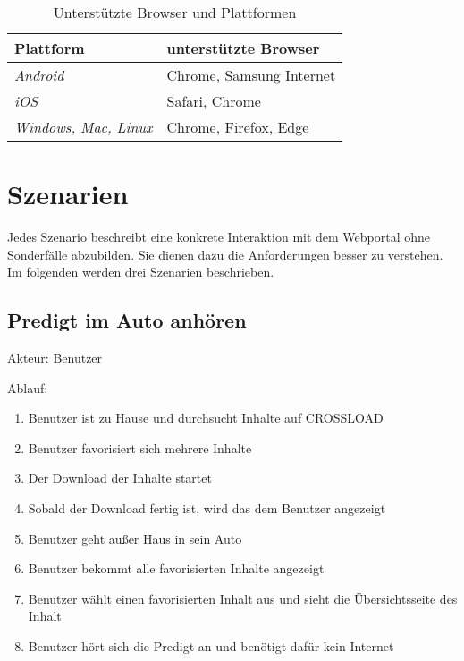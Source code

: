 \begin{table}
  \renewcommand{\arraystretch}{1.2}
  \centering
  \sffamily
  \begin{footnotesize}
    \begin{tabular}{l l}
      \toprule
      \textbf{Plattform} & \textbf{unterstützte Browser} \\
      \midrule
      \emph{Android} & Chrome, Samsung Internet \\
      \emph{iOS} & Safari, Chrome \\
      \emph{Windows, Mac, Linux} & Chrome, Firefox, Edge \\
      \bottomrule
    \end{tabular}
  \end{footnotesize}
  \rmfamily
  \caption{Unterstützte Browser und Plattformen}
  \label{Kap3:Browser}
\end{table}

\section{Szenarien}
\label{Kap3:Szenarien}
Jedes Szenario beschreibt eine konkrete Interaktion mit dem Webportal ohne Sonderfälle abzubilden. Sie dienen dazu die Anforderungen besser zu verstehen. Im folgenden werden drei Szenarien beschrieben.

\subsection{Predigt im Auto anhören}
Akteur: Benutzer

Ablauf:
\begin{enumerate}
	\item Benutzer ist zu Hause und durchsucht Inhalte auf CROSSLOAD
	\item Benutzer favorisiert sich mehrere Inhalte
	\item Der Download der Inhalte startet
	\item Sobald der Download fertig ist, wird das dem Benutzer angezeigt
	\item Benutzer geht außer Haus in sein Auto
	\item Benutzer bekommt alle favorisierten Inhalte angezeigt
	\item Benutzer wählt einen favorisierten Inhalt aus und sieht die Übersichtsseite des Inhalt
	\item Benutzer hört sich die Predigt an und benötigt dafür kein Internet
\end{enumerate}


